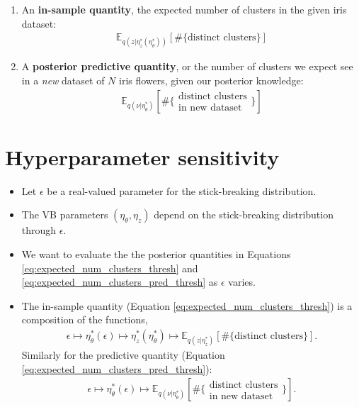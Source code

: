 \documentclass[a0,plainsections]{sciposter}\usepackage[]{graphicx}\usepackage[]{color}
\newcommand{\Expect}{\mathbb{E}}
\newcommand{\etazopt}{\eta_z^{*}}
\newcommand{\etathetaopt}{\eta_\theta^{*}}
\begin{document}
\begin{minipage}[t]{0.45\textwidth}
\begin{enumerate}
\item An {\bf in-sample quantity}, the expected number of clusters in the given iris dataset:
\vspace{-0.3in}
\begin{align}
\Expect_{q(z \vert \etazopt(\etathetaopt))} \left[ \#\{\text{distinct clusters}\} \right]
\label{eq:expected_num_clusters_thresh}
\end{align}

\item A {\bf posterior predictive quantity}, or the number of clusters we expect see in a \textit{new} dataset of $N$ iris flowers, given our posterior knowledge:
\begin{align}
\Expect_{q(\nu \vert \etathetaopt)} 
\left[\#\{\substack{\text{distinct clusters}\\\text{in new dataset}}\} \right] 
    \label{eq:expected_num_clusters_pred_thresh}
\end{align}

\end{enumerate}

\vspace{-0.6in}
\section*{Hyperparameter sensitivity}
\vspace{-0.3in}
\begin{itemize}

\item Let $\epsilon$ be a real-valued parameter for the stick-breaking distribution. 

\item The VB parameters $(\eta_\theta, \eta_z)$ depend on the stick-breaking distribution through $\epsilon$. 

\item We want to evaluate the the posterior quantities in Equations \ref{eq:expected_num_clusters_thresh} and \ref{eq:expected_num_clusters_pred_thresh} as $\epsilon$ varies. 

\item The in-sample quantity (Equation \ref{eq:expected_num_clusters_thresh}) is a composition of the functions, 
\begin{align}
\epsilon \mapsto
\etathetaopt(\epsilon) \mapsto
\etazopt\left(\etathetaopt\right) \mapsto
\Expect_{q(z | \etazopt)} \left[ \#\{\text{distinct clusters}\} \right].
\label{eq:maps_in_sample}
\end{align}
Similarly for the predictive quantity (Equation \ref{eq:expected_num_clusters_pred_thresh}): 
\begin{align}
\epsilon \mapsto
\etathetaopt(\epsilon) \mapsto
\Expect_{q(\nu \vert \etathetaopt)} 
\left[\#\{\substack{\text{distinct clusters}\\\text{in new dataset}}\} \right].
\label{eq:maps_predictive}
\end{align}
\end{itemize}


\end{minipage}
\end{document}
